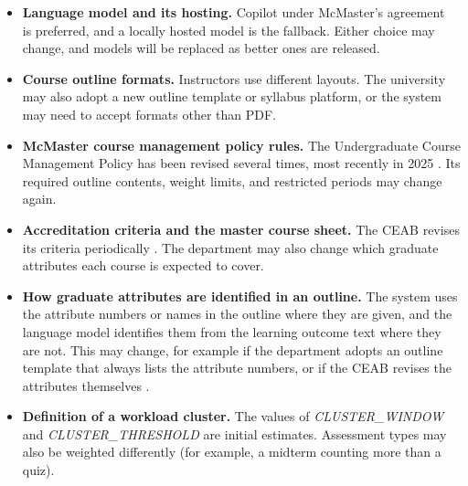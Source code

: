\documentclass[12pt]{article}
\newcounter{lcnum} %
\begin{document}
\noindent \begin{itemize}

\item[LC\refstepcounter{lcnum}\thelcnum\label{LC_LLMHosting}:]
  \textbf{Language model and its hosting.} Copilot under McMaster's agreement~\citep{McMasterCopilot}
  is preferred, and a locally hosted model is the fallback. Either choice may
  change, and models will be replaced as better ones are released.

\item[LC\refstepcounter{lcnum}\thelcnum\label{LC_OutlineFormat}:]
  \textbf{Course outline formats.} Instructors use different layouts. The
  university may also adopt a new outline template or syllabus platform, or
  the system may need to accept formats other than PDF.

\item[LC\refstepcounter{lcnum}\thelcnum\label{LC_PolicyRules}:]
  \textbf{McMaster course management policy rules.} The Undergraduate Course
  Management Policy has been revised several times, most recently in 2025
  \citep{McMasterUCMP2025}. Its required outline contents, weight limits, and
  restricted periods may change again.

\item[LC\refstepcounter{lcnum}\thelcnum\label{LC_AccreditationCriteria}:]
  \textbf{Accreditation criteria and the master course sheet.} The CEAB
  revises its criteria periodically \citep{CEAB2025}. The department may also
  change which graduate attributes each course is expected to cover.

\item[LC\refstepcounter{lcnum}\thelcnum\label{LC_GAInference}:]
  \textbf{How graduate attributes are identified in an outline.} The system
  uses the attribute numbers or names in the outline where they are given, and
  the language model identifies them from the learning outcome text where they
  are not. This may change, for example if the department adopts an outline
  template that always lists the attribute numbers, or if the CEAB revises the
  attributes themselves \citep{CEAB2025}.

\item[LC\refstepcounter{lcnum}\thelcnum\label{LC_ClusterDefinition}:]
  \textbf{Definition of a workload cluster.} The values of
  \textit{CLUSTER\_\allowbreak{}WINDOW} and
  \textit{CLUSTER\_\allowbreak{}THRESHOLD} are initial estimates. Assessment
  types may also be weighted differently (for example, a midterm counting more
  than a quiz).


\end{itemize}
\end{document}
